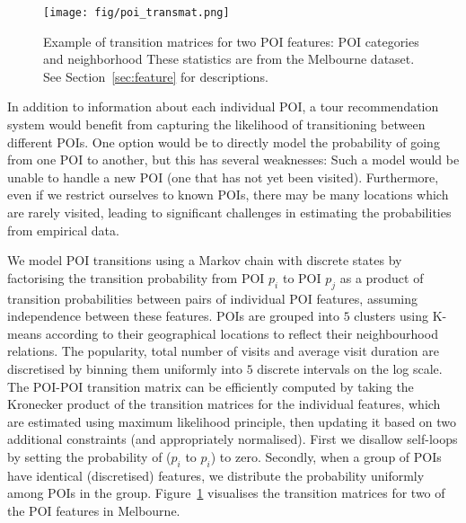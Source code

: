 

\begin{figure}[t]
\texttt{[image: fig/poi\_transmat.png]}
\caption{Example of transition matrices for two POI features: POI categories and neighborhood
These statistics are from the Melbourne dataset. See Section~\ref{sec:feature} for descriptions.}
\label{fig:transmat}
\end{figure}


In addition to information about each individual POI, a tour recommendation system would benefit
from capturing the likelihood of transitioning between different POIs. One option would be to
directly model the probability of going from one POI to another, but this has several weaknesses:
Such a model would be unable to handle a new POI (one that has not yet been visited).
Furthermore, even if we restrict ourselves to known POIs, there may be many locations which
are rarely visited, leading to significant challenges in estimating the probabilities from
empirical data.

We model POI transitions using a Markov chain with discrete %
states by factorising the transition probability from POI $p_i$ to POI $p_j$ 
as a product of transition probabilities between pairs of individual POI features, %
assuming independence between these features.
POIs are grouped into $5$ clusters using K-means according to their geographical locations to reflect their neighbourhood relations.
The popularity, total number of visits and average visit duration are discretised by binning
them uniformly into $5$ discrete intervals on the log scale.
The POI-POI transition matrix can be efficiently computed by taking the Kronecker product of
the transition matrices for the individual features, which are estimated using maximum likelihood principle, 
then updating it based on two additional constraints (and appropriately normalised).
First we disallow self-loops by setting the probability of ($p_i$ to $p_i$) to zero.
Secondly, when a group of POIs have identical (discretised) features, we distribute the probability uniformly among POIs in the group. 
Figure~\ref{fig:transmat} visualises the transition matrices for two of the POI features in Melbourne.
